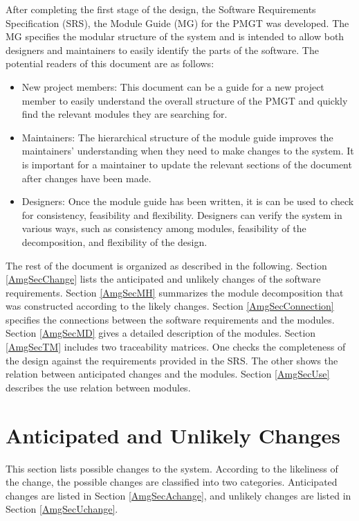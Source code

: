 \documentclass[12pt,titlepage]{article}
\begin{document}
After completing the first stage of the design, the Software Requirements Specification (SRS), the Module Guide (MG) for the PMGT was developed. The MG specifies the modular structure of the system and is intended to allow both designers and maintainers to easily identify the parts of the software. 
The potential readers of this document are as follows:
\begin{itemize}
\item New project members: This document can be a guide for a new project member to easily understand the overall structure of the PMGT and quickly find the relevant modules they are searching for.
\item Maintainers: The hierarchical structure of the module guide improves the maintainers' understanding when they need to make changes to the system. It is important for a maintainer to update the relevant sections of the document after changes have been made.
\item Designers: Once the module guide has been written, it is can be used to check for consistency, feasibility and flexibility. Designers can verify the system in various ways, such as consistency among modules, feasibility of the decomposition, and flexibility of the design. 
\end{itemize}

The rest of the document is organized as described in the following. Section \ref{AmgSecChange} lists the anticipated and unlikely changes of the software requirements. Section \ref{AmgSecMH} summarizes the module decomposition that was constructed according to the likely changes. Section \ref{AmgSecConnection} specifies the connections between the software requirements and the modules. Section \ref{AmgSecMD} gives a detailed description of the modules. Section \ref{AmgSecTM} includes two traceability matrices. One checks the completeness of the design against the requirements provided in the SRS. The other shows the relation between anticipated changes and the modules. Section \ref{AmgSecUse} describes the use relation between modules.

\section{Anticipated and Unlikely Changes \label{AmgSecChange}}
This section lists possible changes to the system. According to the likeliness of the change, the possible changes are classified into two categories. Anticipated changes are listed in Section \ref{AmgSecAchange}, and unlikely changes are listed in Section \ref{AmgSecUchange}.
 
\end{document}
